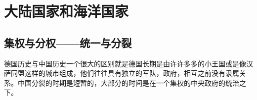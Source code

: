 \section{大陆国家和海洋国家}


\subsection{集权与分权——统一与分裂}

德国历史与中国历史一个很大的区别就是德国长期是由许许多多的小王国或是像汉萨同盟这样的城市组成，他们往往具有独立的军队，政府，相互之前没有隶属关系。中国分裂的时期是短暂的，大部分的时间是在一个集权的中央政府的统治之下。